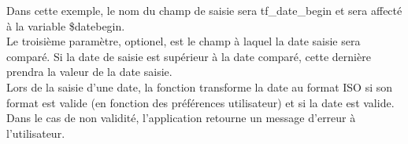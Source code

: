 
Dans cette exemple, le nom du champ de saisie sera tf\_date\_begin et sera affecté à la variable \$datebegin. \\
Le troisième paramètre, optionel, est le champ à laquel la date saisie sera comparé. Si la date de saisie est supérieur à la date comparé, cette dernière prendra la valeur de la date saisie. \\

Lors de la saisie d'une date, la fonction  transforme la date au format ISO si son format est valide (en fonction des préférences utilisateur) et si la date est valide. \\
Dans le cas de non validité, l'application retourne un message d'erreur à l'utilisateur.